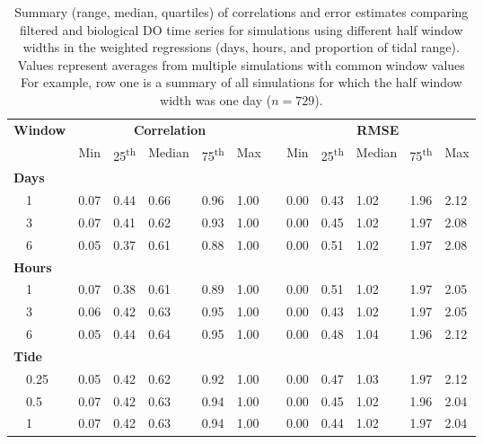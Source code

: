 \documentclass[letterpaper,12pt,oneside]{article}\usepackage[]{graphicx}\usepackage[]{color}
\begin{document}
\begin{table}[!tbp]
\caption{Summary (range, median, quartiles) of correlations and error estimates comparing filtered and biological \ac{DO} time series for simulations using different half window widths in the weighted regressions (days, hours, and proportion of tidal range).  Values represent averages from multiple simulations with common window values For example, row one is a summary of all simulations for which the half window width was one day ($n=729$).\label{tab:dtd_perf2}} 
\begin{center}
\begin{tabular}{llllllclllll}
\hline\hline
\multicolumn{1}{l}{\bfseries Window}&\multicolumn{5}{c}{\bfseries Correlation}&\multicolumn{1}{c}{\bfseries }&\multicolumn{5}{c}{\bfseries RMSE}\tabularnewline
\cline{2-6} \cline{8-12}
\multicolumn{1}{l}{}&\multicolumn{1}{c}{Min}&\multicolumn{1}{c}{25\textsuperscript{th}}&\multicolumn{1}{c}{Median}&\multicolumn{1}{c}{75\textsuperscript{th}}&\multicolumn{1}{c}{Max}&\multicolumn{1}{c}{}&\multicolumn{1}{c}{Min}&\multicolumn{1}{c}{25\textsuperscript{th}}&\multicolumn{1}{c}{Median}&\multicolumn{1}{c}{75\textsuperscript{th}}&\multicolumn{1}{c}{Max}\tabularnewline
\hline
{\bfseries Days}&&&&&&&&&&&\tabularnewline
~~1&0.07&0.44&0.66&0.96&1.00&&0.00&0.43&1.02&1.96&2.12\tabularnewline
~~3&0.07&0.41&0.62&0.93&1.00&&0.00&0.45&1.02&1.97&2.08\tabularnewline
~~6&0.05&0.37&0.61&0.88&1.00&&0.00&0.51&1.02&1.97&2.08\tabularnewline
\hline
{\bfseries Hours}&&&&&&&&&&&\tabularnewline
~~1&0.07&0.38&0.61&0.89&1.00&&0.00&0.51&1.02&1.97&2.05\tabularnewline
~~3&0.06&0.42&0.63&0.95&1.00&&0.00&0.43&1.02&1.97&2.05\tabularnewline
~~6&0.05&0.44&0.64&0.95&1.00&&0.00&0.48&1.04&1.96&2.12\tabularnewline
\hline
{\bfseries Tide}&&&&&&&&&&&\tabularnewline
~~0.25&0.05&0.42&0.62&0.92&1.00&&0.00&0.47&1.03&1.97&2.12\tabularnewline
~~0.5&0.07&0.42&0.63&0.94&1.00&&0.00&0.45&1.02&1.96&2.04\tabularnewline
~~1&0.07&0.42&0.63&0.94&1.00&&0.00&0.44&1.02&1.97&2.04\tabularnewline
\hline
\end{tabular}\end{center}

\end{table}
\end{document}

